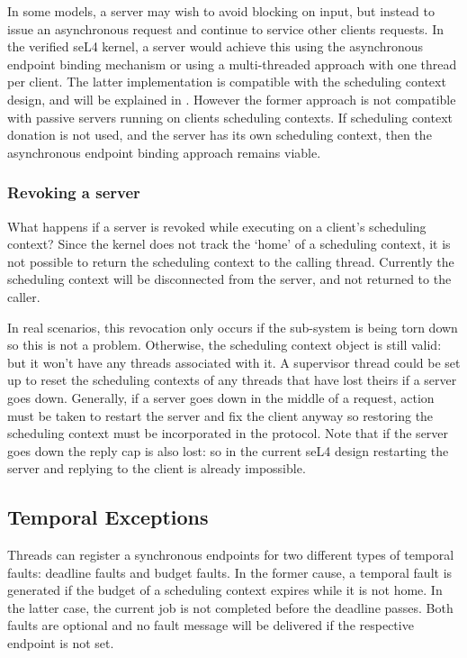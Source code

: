 In some models, a server may wish to avoid blocking on input, but instead to issue an asynchronous request and continue to service other clients requests.
In the verified seL4 kernel, a server would achieve this using the asynchronous endpoint binding mechanism or using a multi-threaded approach with one thread per client.
The latter implementation is compatible with the scheduling context design, and will be explained in .
However the former approach is not compatible with passive servers running on clients scheduling contexts.
If scheduling context donation is not used, and the server has its own scheduling context, then the asynchronous endpoint binding approach remains viable.

\subsubsection{Revoking a server}

What happens if a server is revoked while executing on a client's scheduling context?
Since the kernel does not track the `home' of a scheduling context, it is not possible to return the scheduling context to the calling thread.
Currently the scheduling context will be disconnected from the server, and not returned to the caller.

In real scenarios, this revocation only occurs if the sub-system is being torn down so this is not a problem.
Otherwise, the scheduling context object is still valid: but it won't have any threads associated with it.
A supervisor thread could be set up to reset the scheduling contexts of any threads that have lost theirs if a server goes down.
Generally, if a server goes down in the middle of a request, action must be taken to restart the server and fix the client anyway so restoring the scheduling context must be incorporated in the protocol.
Note that if the server goes down the reply cap is also lost: so in the current seL4 design restarting the server and replying to the client is already impossible.

\subsection{Temporal Exceptions}

Threads can register a synchronous endpoints for two different types of temporal faults: deadline faults and budget faults.
In the former cause, a temporal fault is generated if the budget of a scheduling context expires while it is not home.
In the latter case, the current job is not completed before the deadline passes.
Both faults are optional and no fault message will be delivered if the respective endpoint is not set.

